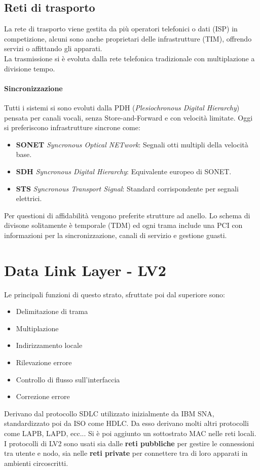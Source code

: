 \documentclass[12pt]{article}
\begin{document}
\subsection{Reti di trasporto}
La rete di trasporto viene gestita da più operatori telefonici o dati (ISP) in competizione, alcuni sono anche proprietari delle infrastrutture (TIM), offrendo servizi o affittando gli apparati.\\
La trasmissione si è evoluta dalla rete telefonica tradizionale con multiplazione a divisione tempo.
\paragraph{Sincronizzazione}
Tutti i sistemi si sono evoluti dalla PDH (\textit{Plesiochronous Digital Hierarchy}) pensata per canali vocali, senza Store-and-Forward e con velocità limitate. Oggi si preferiscono infrastrutture sincrone come:
\begin{itemize}
  \item \textbf{SONET} \textit{Syncronous Optical NETwork}: Segnali otti multipli della velocità base.
  \item \textbf{SDH} \textit{Syncronous Digital Hierarchy}: Equivalente europeo di SONET.
  \item \textbf{STS} \textit{Syncronous Transport Signal}: Standard corrispondente per segnali elettrici.
\end{itemize}
Per questioni di affidabilità vengono preferite strutture ad anello. Lo schema di divisone solitamente è temporale (TDM) ed ogni trama include una PCI con informazioni per la sincronizzazione, canali di servizio e gestione guasti.

\section{Data Link Layer - LV2} \label{LV2}
Le principali funzioni di questo strato, sfruttate poi dal superiore sono:
\begin{itemize}
  \item Delimitazione di trama
  \item Multiplazione
  \item Indirizzamento locale
  \item Rilevazione errore
  \item Controllo di flusso sull'interfaccia
  \item Correzione errore
\end{itemize}
Derivano dal protocollo SDLC utilizzato inizialmente da IBM SNA, standardizzato poi da ISO come HDLC. Da esso derivano molti altri protocolli come LAPB, LAPD, ecc... Si è poi aggiunto un sottostrato MAC nelle reti locali.\\
I protocolli di LV2 sono usati sia dalle \textbf{reti pubbliche} per gestire le connessioni tra utente e nodo, sia nelle \textbf{reti private} per connettere tra di loro apparati in ambienti circoscritti.
\end{document}
